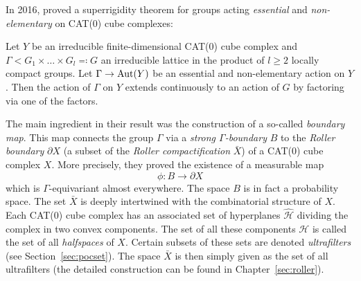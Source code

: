 In 2016, \textcite{MR3509968} proved a superrigidity theorem for groups acting \emph{essential} and \emph{non-elementary} on CAT(0) cube complexes:

\begin{thm}[{\cite[Theorem 1.5]{MR3509968}}]
  Let \(Y\) be an irreducible finite-dimensional CAT(0) cube complex and \(\Gamma < G_1 \times \dots \times G_l \eqqcolon G\) an irreducible lattice in the product of \(l \geq 2\) locally compact groups. Let \(\Gamma \to \operatorname{Aut}(Y)\) be an essential and non-elementary action on \(Y\). Then the action of \(\Gamma\) on \(Y\) extends continuously to an action of \(G\) by factoring via one of the factors.
\end{thm}

The main ingredient in their result was the construction of a so-called \emph{boundary map}. This map connects the group \(\Gamma\) via a \emph{strong \(\Gamma\)-boundary} \(B\) to the \emph{Roller boundary} \(\partial X\) (a subset of the \emph{Roller compactification} \(\bar X\)) of a CAT(0) cube complex \(X\). More precisely, they proved the existence of a measurable map
\[
  \phi\colon B \to \partial X
\]
which is \(\Gamma\)-equivariant almost everywhere. The space \(B\) is in fact a probability space. The set \(\bar X\) is deeply intertwined with the combinatorial structure of \(X\). Each CAT(0) cube complex has an associated set of hyperplanes \(\mathcal{\hat H}\) dividing the complex in two convex components. The set of all these components \(\mathcal{H}\) is called the set of all \emph{halfspaces} of \(X\). Certain subsets of these sets are denoted \emph{ultrafilters} (see Section~\ref{sec:pocset}). The space \(\bar X\) is then simply given as the set of all ultrafilters (the detailed construction can be found in Chapter~\ref{sec:roller}).

